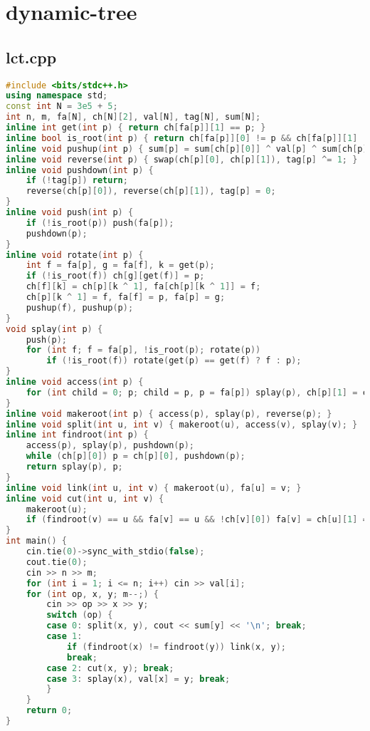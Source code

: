 \documentclass[9pt, a4paper, oneside]{book}
\begin{document}
\section{dynamic-tree}
\subsection{lct.cpp}
\begin{lstlisting}[language={C++}]
#include <bits/stdc++.h>
using namespace std;
const int N = 3e5 + 5;
int n, m, fa[N], ch[N][2], val[N], tag[N], sum[N];
inline int get(int p) { return ch[fa[p]][1] == p; }
inline bool is_root(int p) { return ch[fa[p]][0] != p && ch[fa[p]][1] != p; }
inline void pushup(int p) { sum[p] = sum[ch[p][0]] ^ val[p] ^ sum[ch[p][1]]; }
inline void reverse(int p) { swap(ch[p][0], ch[p][1]), tag[p] ^= 1; }
inline void pushdown(int p) {
    if (!tag[p]) return;
    reverse(ch[p][0]), reverse(ch[p][1]), tag[p] = 0;
}
inline void push(int p) {
    if (!is_root(p)) push(fa[p]);
    pushdown(p);
}
inline void rotate(int p) {
    int f = fa[p], g = fa[f], k = get(p);
    if (!is_root(f)) ch[g][get(f)] = p;
    ch[f][k] = ch[p][k ^ 1], fa[ch[p][k ^ 1]] = f;
    ch[p][k ^ 1] = f, fa[f] = p, fa[p] = g;
    pushup(f), pushup(p);
}
void splay(int p) {
    push(p);
    for (int f; f = fa[p], !is_root(p); rotate(p))
        if (!is_root(f)) rotate(get(p) == get(f) ? f : p);
}
inline void access(int p) {
    for (int child = 0; p; child = p, p = fa[p]) splay(p), ch[p][1] = child, pushup(p);
}
inline void makeroot(int p) { access(p), splay(p), reverse(p); }
inline void split(int u, int v) { makeroot(u), access(v), splay(v); }
inline int findroot(int p) {
    access(p), splay(p), pushdown(p);
    while (ch[p][0]) p = ch[p][0], pushdown(p);
    return splay(p), p;
}
inline void link(int u, int v) { makeroot(u), fa[u] = v; }
inline void cut(int u, int v) {
    makeroot(u);
    if (findroot(v) == u && fa[v] == u && !ch[v][0]) fa[v] = ch[u][1] = 0, pushup(u);
}
int main() {
    cin.tie(0)->sync_with_stdio(false);
    cout.tie(0);
    cin >> n >> m;
    for (int i = 1; i <= n; i++) cin >> val[i];
    for (int op, x, y; m--;) {
        cin >> op >> x >> y;
        switch (op) {
        case 0: split(x, y), cout << sum[y] << '\n'; break;
        case 1:
            if (findroot(x) != findroot(y)) link(x, y);
            break;
        case 2: cut(x, y); break;
        case 3: splay(x), val[x] = y; break;
        }
    }
    return 0;
}
\end{lstlisting}
\end{document}
